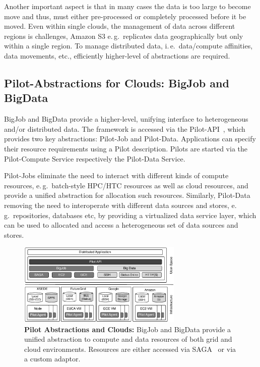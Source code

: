 \documentclass[times]{cpeauth}
\newcommand{\pilot}{Pilot\xspace}
\newcommand{\pilots}{Pilots\xspace}
\newcommand{\pilotjob}{Pilot-Job\xspace}
\newcommand{\pilotjobs}{Pilot-Jobs\xspace}
\newcommand{\pilotdata}{Pilot-Data\xspace}
\newcommand{\pilotdataservice}{Pilot-Data Service\xspace}
\newcommand{\pilotcomputeservice}{Pilot-Compute Service\xspace}
\begin{document}
Another important aspect is that in many cases the data is too large to become
move and thus, must either pre-processed or completely processed before it be 
moved. Even within single clouds, the management of data across different 
regions is challenges, Amazon S3 e.\,g.\ replicates data geographically but 
only within a single region. To manage distributed data, i.\,e.\ data/compute 
affinities, data movements, etc., efficiently higher-level of abstractions
are required.




\subsection{Pilot-Abstractions for Clouds: BigJob and BigData}

BigJob and BigData provide a higher-level, unifying interface to heterogeneous
and/or distributed data. The framework is accessed via the
Pilot-API~\cite{pilot_api}, which provides two key abstractions: \pilotjob and
\pilotdata. Applications can specify their resource requirements using a
\pilot description. \pilots are started via the \pilotcomputeservice
respectively the \pilotdataservice.

\pilotjobs eliminate the need to interact with different kinds of compute 
resources, e.\,g.\ batch-style HPC/HTC resources as well as cloud resources, 
and provide a unified abstraction for allocation such resources. Similarly, 
\pilotdata removing the need to interoperate with different data sources and 
stores, e.\,g.\ repositories, databases etc, by providing a virtualized data 
service layer, which can be used to allocated and access a heterogeneous set 
of data sources and stores.

\begin{figure}[t]
	\centering
		\includegraphics[width=0.7\textwidth]{figures/cloud_pilot_job.pdf}
	\caption{\textbf{Pilot Abstractions and Clouds:} BigJob and BigData 
	provide a unified abstraction to compute and data resources of both grid 
	and cloud environments. Resources are either accessed via 
	SAGA~\cite{ogf-gfd-90,saga-bliss-pd} or via a custom adaptor.}
	\label{fig:figures_cloud_pilot_job}
\end{figure}
\end{document}
